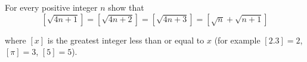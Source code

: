 For every positive integer $n$ show that\[[\sqrt{4n + 1}] = [\sqrt{4n + 2}] = [\sqrt{4n + 3}] = [\sqrt{n} + \sqrt{n + 1}]\]

where $[x]$ is the greatest integer less than or equal to $x$ (for example $[2.3] = 2$,  $[\pi] = 3$,  $[5] = 5$).